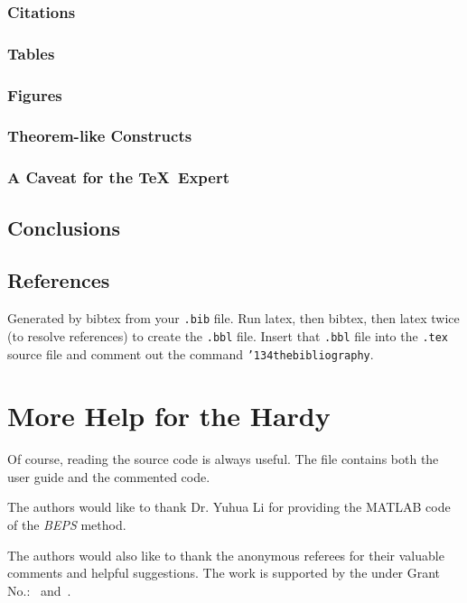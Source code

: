 \subsubsection{Citations}
\subsubsection{Tables}
\subsubsection{Figures}
\subsubsection{Theorem-like Constructs}
\subsubsection*{A Caveat for the \TeX\ Expert}
\subsection{Conclusions}
\subsection{References}
Generated by bibtex from your \texttt{.bib} file.  Run latex,
then bibtex, then latex twice (to resolve references)
to create the \texttt{.bbl} file.  Insert that \texttt{.bbl}
file into the \texttt{.tex} source file and comment out
the command \texttt{{\char'134}thebibliography}.
\section{More Help for the Hardy}

Of course, reading the source code is always useful.  The file
 contains both the user guide and the commented
code.

\begin{acks}
  The authors would like to thank Dr. Yuhua Li for providing the
  MATLAB code of the \textit{BEPS} method.

  The authors would also like to thank the anonymous referees for
  their valuable comments and helpful suggestions. The work is
  supported by the  under Grant
  No.:~
  and~.

\end{acks}

